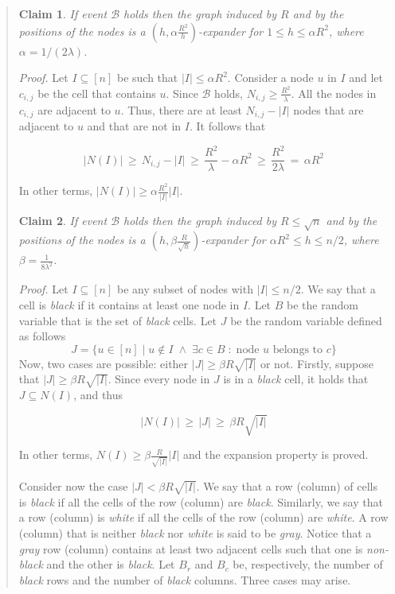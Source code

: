 \documentclass[10pt,a4paper]{article}
\newtheorem{claim}{Claim}
\newcommand{\proof}{\noindent\textit{Proof. }}
\newcommand{\qed}{\hspace{\stretch{1}$\square$}}
\begin{document}
\begin{quote}
\begin{claim}\label{claim:exp1}
If event $\mathcal{B}$ holds then the graph induced by $R$ and by the positions of the nodes is a $(h,
\alpha\frac{R^2}{h})$-expander for $1 \leqslant h \leqslant \alpha R^2$, where $\alpha =
1/(2\lambda)$.
\end{claim}
\proof Let $I \subseteq [n]$ be such that $|I| \leqslant \alpha R^2$. Consider a node  $u$ in $I$ and
let $c_{i,j}$ be the cell that contains $u$. Since $\mathcal{B}$ holds, $N_{i,j} \geqslant
\frac{R^2}{\lambda}$. All the nodes in $c_{i,j}$ are adjacent to $u$. Thus, there are at least
$N_{i,j} - |I|$ nodes that are adjacent to $u$ and that are not in $I$. It follows that
\begin{small} $$
|N(I)|  \, \geqslant \,  N_{i,j} - |I| \, \geqslant \, \frac{R^2}{\lambda} - \alpha R^2 \, \geqslant \,
\frac{R^2}{2\lambda} \, = \, \alpha R^2
$$ \end{small}
In other terms, $|N(I)| \geqslant \alpha\frac{R^2}{|I|} |I|$.
\qed

\begin{claim}\label{claim:exp2}
If event $\mathcal{B}$ holds then the graph induced by $R \leqslant \sqrt{n}$ and by the positions of
the nodes is a $(h, \beta\frac{R}{\sqrt{h}})$-expander for $\alpha R^2 \leqslant h \leqslant n/2$,
where $\beta = \frac{1}{8\lambda^2}$.
\end{claim}
\proof Let $I \subseteq [n]$ be any subset of nodes with $|I| \leqslant n/2$. We say that a cell is
\emph{black} if it contains at least one node in $I$. Let $B$ be the random variable that is the set of \emph{black} cells. Let $J$ be the random variable defined as follows
$$
J = \{ u\in [n]\;|\; u\not\in I \;\wedge\; \exists c\in B\;:\; \mbox{node $u$ belongs to $c$}\}
$$
Now, two cases are possible: either $|J| \geqslant \beta R \sqrt{|I|}$ or not. Firstly, suppose that
$|J| \geqslant \beta R \sqrt{|I|}$. Since every node in $J$ is in a \emph{black} cell, it holds that
$J \subseteq N(I)$, and thus
\begin{small} $$
|N(I)| \, \geqslant \, |J| \, \geqslant \, \beta R \sqrt{|I|}
$$ \end{small}
In other terms, $N(I) \geqslant \beta\frac{R}{\sqrt{|I|}}|I|$ and the expansion property is proved.

\noindent Consider now the case $|J| < \beta R \sqrt{|I|}$. We say that a row (column) of cells is
\emph{black} if all the cells of the row (column) are \emph{black}. Similarly, we say that a row
(column) is \emph{white} if all the cells of the row (column) are \emph{white}. A row (column) that is
neither \emph{black} nor \emph{white} is said to be \emph{gray}. Notice that a \emph{gray} row
(column) contains at least two adjacent cells such that one is \emph{non-black} and the other is
\emph{black}. Let $B_r$ and $B_c$ be, respectively, the number of \emph{black} rows and the number of
\emph{black} columns. Three cases may arise.


\end{quote}
\end{document}
